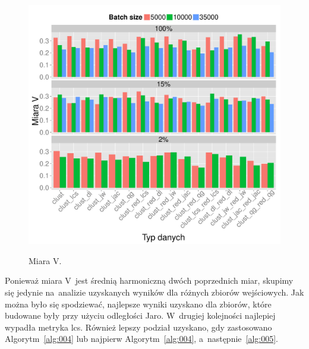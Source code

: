\documentclass{praca1}
\begin{document}

\begin{figure}[!h]
  \centering
  \includegraphics[width=400pt]{plot12.pdf}\\
  \caption{Miara V.}\label{plot:007}
\end{figure}

Ponieważ miara V~jest średnią harmoniczną dwóch poprzednich miar, skupimy się jedynie na~analizie uzyskanych wyników dla różnych zbiorów wejściowych. Jak można było się spodziewać, najlepsze wyniki uzyskano dla zbiorów, które budowane były przy użyciu odległości Jaro. W~drugiej kolejności najlepiej wypadła metryka lcs. Również lepszy podział uzyskano, gdy zastosowano Algorytm~\ref{alg:004} lub najpierw Algorytm~\ref{alg:004}, a~następnie~\ref{alg:005}. 
\end{document}
